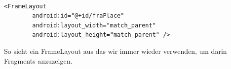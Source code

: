 \documentclass[FIPLY_base.tex]{subfiles}
\begin{document}
\ \\
\begin{lstlisting}[caption={Die Definition eines FrameLayouts in einem Layout XML File},label=DescriptiveLabel]
<FrameLayout
        android:id="@+id/fraPlace"
        android:layout_width="match_parent"
        android:layout_height="match_parent" />
\end{lstlisting}
So sieht ein FrameLayout aus das wir immer wieder verwenden, um darin Fragments anzuzeigen.

\end{document}
